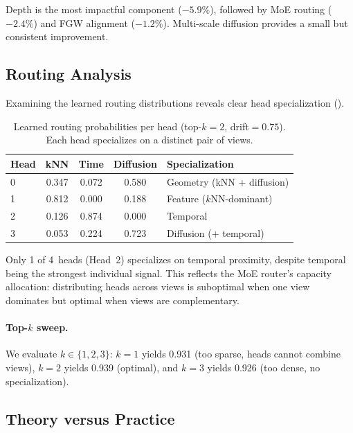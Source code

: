 \documentclass[11pt,a4paper]{article}
\begin{document}
Depth is the most impactful component ($-5.9\%$), followed by MoE
routing ($-2.4\%$) and FGW alignment ($-1.2\%$).
Multi-scale diffusion provides a small but consistent improvement.

\subsection{Routing Analysis}
\label{sec:routing_analysis}

Examining the learned routing distributions reveals clear head
specialization ().

\begin{table}[t]
\centering
\caption{Learned routing probabilities per head (top-$k=2$, drift${}=0.75$).
Each head specializes on a distinct pair of views.}
\label{tab:routing}
\begin{tabular}{@{}lcccl@{}}
\toprule
Head & kNN & Time & Diffusion & Specialization \\
\midrule
0 & 0.347 & 0.072 & 0.580 & Geometry (kNN + diffusion) \\
1 & 0.812 & 0.000 & 0.188 & Feature ($k$NN-dominant) \\
2 & 0.126 & 0.874 & 0.000 & Temporal \\
3 & 0.053 & 0.224 & 0.723 & Diffusion (+ temporal) \\
\bottomrule
\end{tabular}
\end{table}

Only 1 of 4~heads (Head~2) specializes on temporal proximity, despite
temporal being the strongest individual signal.
This reflects the MoE router's capacity allocation: distributing heads
across views is suboptimal when one view dominates but optimal when views
are complementary.

\paragraph{Top-$k$ sweep.}
We evaluate $k \in \{1, 2, 3\}$: $k=1$ yields 0.931 (too sparse,
heads cannot combine views), $k=2$ yields 0.939 (optimal), and $k=3$
yields 0.926 (too dense, no specialization).

\subsection{Theory versus Practice}
\label{sec:theory_vs_practice}
\end{document}
